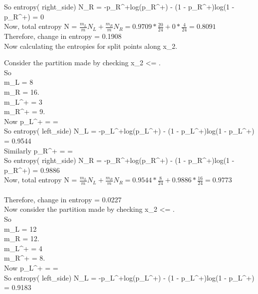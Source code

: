\documentclass[twoside,10pt,a4paper]{article}
\theoremstyle{definition}
\theoremstyle{definition}
\theoremstyle{remark}
\renewcommand{\>}{{\rightarrow}}
\newcommand{\1}{{\mathbf 1}}
\newcommand{\0}{{\mathbf 0}}
\begin{document}
So
entropy( right\_side) N_R = -p_R^+log(p_R^+) - (1 - p_R^+)log(1 - p_R^+) = 0\\

Now, total entropy N = $\frac{ m_L }{ m } N_L + \frac{m_R}{m} N_R = 0.9709 * \frac{20}{24} + 0 * \frac{4}{24} = 0.8091$\\

Therefore, change in entropy = 0.1908\\

Now calculating the entropies for split points along x_2.

Consider the partition made by checking x_2 <= .\\

So \\
m_L = 8 \\
m_R = 16.\\
m_L^+ = 3 \\
m_R^+ = 9.\\

Now
p_L^+ =  =  \\

So
entropy( left\_side) N_L = -p_L^+log(p_L^+) - (1 - p_L^+)log(1 - p_L^+) = 0.9544\\

Similarly
p_R^+ =  =  \\

So
entropy( right\_side) N_R = -p_R^+log(p_R^+) - (1 - p_R^+)log(1 - p_R^+) = 0.9886\\

Now, total entropy N = $\frac{ m_L }{ m } N_L + \frac{m_R}{m} N_R = 0.9544 * \frac{8}{24} + 0.9886 * \frac{16}{24} = 0.9773$\\ ~\\

Therefore, change in entropy = 0.0227\\

Now consider the partition made by checking x_2 <= .\\

So \\
m_L = 12 \\
m_R = 12.\\
m_L^+ = 4 \\
m_R^+ = 8.\\

Now
p_L^+ =  =  \\

So
entropy( left\_side) N_L = -p_L^+log(p_L^+) - (1 - p_L^+)log(1 - p_L^+) = 0.9183\\
\end{document}
